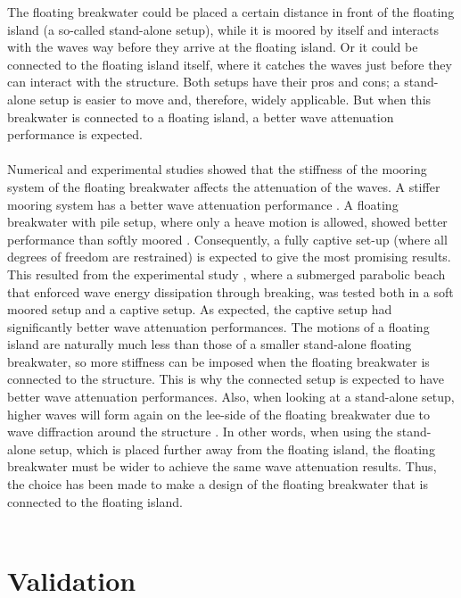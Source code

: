 The floating breakwater could be placed a certain distance in front of the floating island (a so-called stand-alone setup), while it is moored by itself and interacts with the waves way before they arrive at the floating island. Or it could be connected to the floating island itself, where it catches the waves just before they can interact with the structure. Both setups have their pros and cons; a stand-alone setup is easier to move and, therefore, widely applicable. But when this breakwater is connected to a floating island, a better wave attenuation performance is expected.\\
\\
Numerical and experimental studies showed that the stiffness of the mooring system of the floating breakwater affects the attenuation of the waves. A stiffer mooring system has a better wave attenuation performance \parencite{Loukogeorgaki2006} \parencite{Loukogeorgaki2017}. A floating breakwater with pile setup, where only a heave motion is allowed, showed better performance than softly moored \parencite{Ruol2012}. Consequently, a fully captive set-up (where all degrees of freedom are restrained) is expected to give the most promising results. This resulted from the experimental study \parencite{Zanden2021}, where a submerged parabolic beach that enforced wave energy dissipation through breaking, was tested both in a soft moored setup and a captive setup. As expected, the captive setup had significantly better wave attenuation performances. The motions of a floating island are naturally much less than those of a smaller stand-alone floating breakwater, so more stiffness can be imposed when the floating breakwater is connected to the structure. This is why the connected setup is expected to have better wave attenuation performances. 
Also, when looking at a stand-alone setup, higher waves will form again on the lee-side of the floating breakwater due to wave diffraction around the structure \parencite{Holthuijsen2007} \parencite{Zanden2021}. In other words, when using the stand-alone setup, which is placed further away from the floating island, the floating breakwater must be wider to achieve the same wave attenuation results. Thus, the choice has been made to make a design of the floating breakwater that is connected to the floating island. \\
\\


\section{Validation}
\label{sec: methodology validation}

